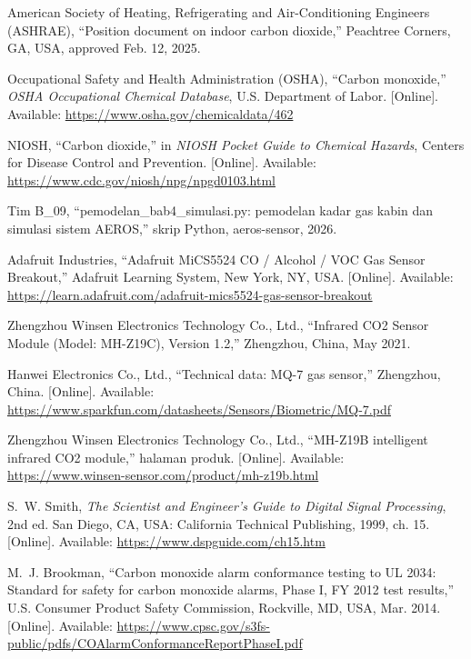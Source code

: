 American Society of Heating, Refrigerating and Air-Conditioning Engineers (ASHRAE), ``Position document on indoor carbon dioxide,'' Peachtree Corners, GA, USA, approved Feb. 12, 2025.

Occupational Safety and Health Administration (OSHA), ``Carbon monoxide,'' \emph{OSHA Occupational Chemical Database}, U.S. Department of Labor. [Online]. Available: \url{https://www.osha.gov/chemicaldata/462}

NIOSH, ``Carbon dioxide,'' in \emph{NIOSH Pocket Guide to Chemical Hazards}, Centers for Disease Control and Prevention. [Online]. Available: \url{https://www.cdc.gov/niosh/npg/npgd0103.html}




Tim B\_09, ``pemodelan\_bab4\_simulasi.py: pemodelan kadar gas kabin dan simulasi sistem AEROS,'' skrip Python, aeros-sensor, 2026.

Adafruit Industries, ``Adafruit MiCS5524 CO / Alcohol / VOC Gas Sensor Breakout,'' Adafruit Learning System, New York, NY, USA. [Online]. Available: \url{https://learn.adafruit.com/adafruit-mics5524-gas-sensor-breakout}

Zhengzhou Winsen Electronics Technology Co., Ltd., ``Infrared CO2 Sensor Module (Model: MH-Z19C), Version 1.2,'' Zhengzhou, China, May 2021.

Hanwei Electronics Co., Ltd., ``Technical data: MQ-7 gas sensor,'' Zhengzhou, China. [Online]. Available: \url{https://www.sparkfun.com/datasheets/Sensors/Biometric/MQ-7.pdf}

Zhengzhou Winsen Electronics Technology Co., Ltd., ``MH-Z19B intelligent infrared CO2 module,'' halaman produk. [Online]. Available: \url{https://www.winsen-sensor.com/product/mh-z19b.html}

S.~W. Smith, \emph{The Scientist and Engineer's Guide to Digital Signal Processing}, 2nd ed. San Diego, CA, USA: California Technical Publishing, 1999, ch. 15. [Online]. Available: \url{https://www.dspguide.com/ch15.htm}

M.~J. Brookman, ``Carbon monoxide alarm conformance testing to UL 2034: Standard for safety for carbon monoxide alarms, Phase I, FY 2012 test results,'' U.S. Consumer Product Safety Commission, Rockville, MD, USA, Mar. 2014. [Online]. Available: \url{https://www.cpsc.gov/s3fs-public/pdfs/COAlarmConformanceReportPhaseI.pdf}

